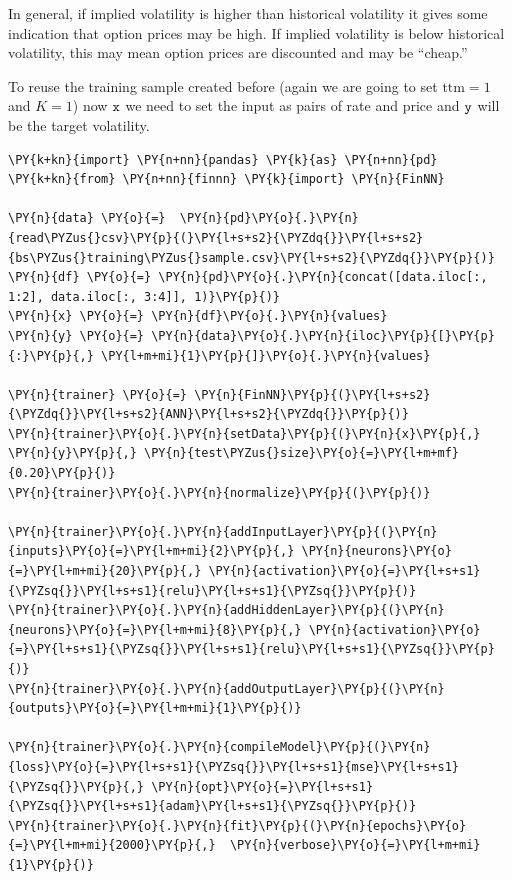 In general, if implied volatility is higher than historical volatility it gives some indication that option prices may be high. If implied volatility is below historical volatility, this may mean option prices are discounted and may be “cheap.”

To reuse the training sample created before (again we
are going to set \(\mathrm{ttm}=1\) and \(K=1\)) now \(\tt{x}\) we need to set the input as pairs of rate and price and \(\tt{y}\) will be the target volatility.

\begin{tcolorbox}[breakable, size=fbox, boxrule=1pt, pad at break*=1mm,colback=cellbackground, colframe=cellborder]
\begin{Verbatim}[commandchars=\\\{\}]
\PY{k+kn}{import} \PY{n+nn}{pandas} \PY{k}{as} \PY{n+nn}{pd}
\PY{k+kn}{from} \PY{n+nn}{finnn} \PY{k}{import} \PY{n}{FinNN}
	
\PY{n}{data} \PY{o}{=}  \PY{n}{pd}\PY{o}{.}\PY{n}{read\PYZus{}csv}\PY{p}{(}\PY{l+s+s2}{\PYZdq{}}\PY{l+s+s2}{bs\PYZus{}training\PYZus{}sample.csv}\PY{l+s+s2}{\PYZdq{}}\PY{p}{)}
\PY{n}{df} \PY{o}{=} \PY{n}{pd}\PY{o}{.}\PY{n}{concat([data.iloc[:, 1:2], data.iloc[:, 3:4]], 1)}\PY{p}{)}
\PY{n}{x} \PY{o}{=} \PY{n}{df}\PY{o}{.}\PY{n}{values}
\PY{n}{y} \PY{o}{=} \PY{n}{data}\PY{o}{.}\PY{n}{iloc}\PY{p}{[}\PY{p}{:}\PY{p}{,} \PY{l+m+mi}{1}\PY{p}{]}\PY{o}{.}\PY{n}{values}

\PY{n}{trainer} \PY{o}{=} \PY{n}{FinNN}\PY{p}{(}\PY{l+s+s2}{\PYZdq{}}\PY{l+s+s2}{ANN}\PY{l+s+s2}{\PYZdq{}}\PY{p}{)}
\PY{n}{trainer}\PY{o}{.}\PY{n}{setData}\PY{p}{(}\PY{n}{x}\PY{p}{,} \PY{n}{y}\PY{p}{,} \PY{n}{test\PYZus{}size}\PY{o}{=}\PY{l+m+mf}{0.20}\PY{p}{)}
\PY{n}{trainer}\PY{o}{.}\PY{n}{normalize}\PY{p}{(}\PY{p}{)}
	
\PY{n}{trainer}\PY{o}{.}\PY{n}{addInputLayer}\PY{p}{(}\PY{n}{inputs}\PY{o}{=}\PY{l+m+mi}{2}\PY{p}{,} \PY{n}{neurons}\PY{o}{=}\PY{l+m+mi}{20}\PY{p}{,} \PY{n}{activation}\PY{o}{=}\PY{l+s+s1}{\PYZsq{}}\PY{l+s+s1}{relu}\PY{l+s+s1}{\PYZsq{}}\PY{p}{)}
\PY{n}{trainer}\PY{o}{.}\PY{n}{addHiddenLayer}\PY{p}{(}\PY{n}{neurons}\PY{o}{=}\PY{l+m+mi}{8}\PY{p}{,} \PY{n}{activation}\PY{o}{=}\PY{l+s+s1}{\PYZsq{}}\PY{l+s+s1}{relu}\PY{l+s+s1}{\PYZsq{}}\PY{p}{)}
\PY{n}{trainer}\PY{o}{.}\PY{n}{addOutputLayer}\PY{p}{(}\PY{n}{outputs}\PY{o}{=}\PY{l+m+mi}{1}\PY{p}{)}

\PY{n}{trainer}\PY{o}{.}\PY{n}{compileModel}\PY{p}{(}\PY{n}{loss}\PY{o}{=}\PY{l+s+s1}{\PYZsq{}}\PY{l+s+s1}{mse}\PY{l+s+s1}{\PYZsq{}}\PY{p}{,} \PY{n}{opt}\PY{o}{=}\PY{l+s+s1}{\PYZsq{}}\PY{l+s+s1}{adam}\PY{l+s+s1}{\PYZsq{}}\PY{p}{)}
\PY{n}{trainer}\PY{o}{.}\PY{n}{fit}\PY{p}{(}\PY{n}{epochs}\PY{o}{=}\PY{l+m+mi}{2000}\PY{p}{,}  \PY{n}{verbose}\PY{o}{=}\PY{l+m+mi}{1}\PY{p}{)}
	

\end{Verbatim}
\end{tcolorbox}
